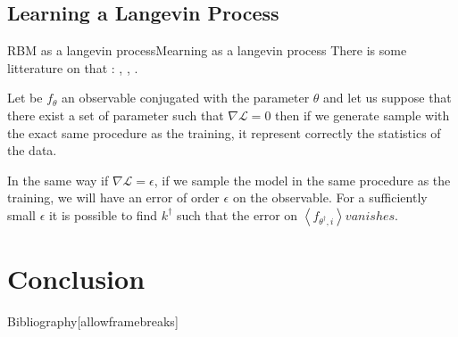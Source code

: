 \documentclass{beamer}
\begin{document}
\subsection{Learning a Langevin Process}
\begin{frame}{RBM as a langevin process}{Mearning as a langevin process}
There is some litterature on that : \cite{Agoritsas2023}, \cite{Decelle2018}, \cite{Decelle2022}.

\begin{theorem}
    Let be $f_\theta$ an observable conjugated with the parameter $\theta$ and let us suppose that there exist a set of parameter such that $\nabla \mathcal{L}=0$ then if we generate sample with the exact same procedure as the training, it represent correctly the statistics of the data.
\end{theorem}

\begin{theorem}
    In the same way if $\nabla \mathcal{L}=\epsilon$, if we sample the model in the same procedure as the training, we will have an error of order $\epsilon$ on the observable. For a sufficiently small $\epsilon$ it is possible to find $k^{\dagger}$ such that the error on $\left< f_{\theta^{\dagger},i}\right> vanishes.$
\end{theorem}
    
\end{frame}

\section*{Conclusion}

\begin{frame}{Bibliography}[allowframebreaks]
    
    
\end{frame}
\end{document}
